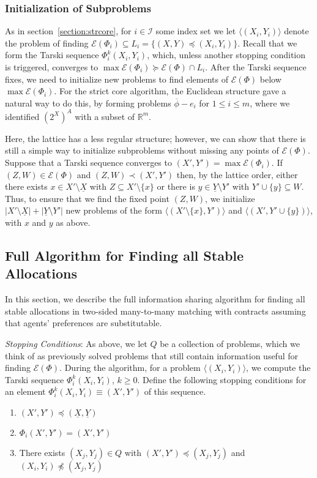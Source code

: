 \documentclass[11pt,reqno]{amsart}
\theoremstyle{definition}
\numberwithin{equation}{section}
\newcommand{\mr}{\mathbb{R}}
\newcommand{\ol}{\overline}
\newcommand{\ul}{\underline}
\newcommand{\lag}{\langle}
\newcommand{\rag}{\rangle}
\newcommand{\pre}{\phi}
\newcommand{\prealloc}{(2^X)^A}
\newcommand{\sub}{\subseteq}
\newcommand{\fix}{\mathcal{E}}
\newcommand{\suq}{\succeq}
\newcommand{\peq}{\preceq}
\newcommand{\pe}{\prec}
\newcommand{\toppre}{\ol{\pre}}
\newcommand{\act}{Q}
\newcommand{\lattice}{L}
\newcommand{\botx}{\ul{X}}
\newcommand{\boty}{\ul{Y}}
\begin{document}
\subsubsection{Initialization of Subproblems}
As in section~\ref{section:strcore}, for $i \in \mathcal{I}$ some index set we let $\lag (X_i, Y_i) \rag$ denote the problem of finding $\fix(\Phi_i) \sub \lattice_i = \{(X,Y) \peq (X_i, Y_i) \}$.
Recall that we form the Tarski sequence $\Phi_i^k(X_i,Y_i)$, which, unless another stopping condition is triggered, converges to $\max \fix(\Phi_i) \suq \fix(\Phi) \cap \lattice_i$.
After the Tarski sequence fixes, we need to initialize new problems to find elements of $\fix(\Phi)$ below $\max \fix(\Phi_i)$.
For the strict core algorithm, the Euclidean structure gave a natural way to do this, by forming problems $\toppre - e_i$ for $1 \leq i \leq m$, where we identified $\prealloc$ with a subset of $\mr^m$. 

Here, the lattice has a less regular structure; however, we can show that there is still a simple way to initialize subproblems without missing any points of $\fix(\Phi)$.
Suppose that a Tarski sequence converges to $(X',Y') = \max \fix(\Phi_i)$.
If $(Z,W) \in \fix(\Phi)$ and $(Z,W) \pe (X',Y')$ then, by the lattice order, either there exists $x \in X' \setminus \botx$ with $Z \sub X' \setminus \{x\}$ or there is $y \in \boty \setminus Y'$ with $Y' \cup \{y\} \sub W$.
Thus, to ensure that we find the fixed point $(Z,W)$, we initialize $|X' \setminus \botx| + |\boty \setminus Y'|$ new problems of the form $\lag (X' \setminus \{x\},Y') \rag$ and $\lag (X',Y' \cup \{y\}) \rag$, with $x$ and $y$ as above.

\subsection{Full Algorithm for Finding all Stable Allocations} \label{section:algostable}

In this section, we describe the full information sharing algorithm for finding all stable allocations in two-sided many-to-many matching with contracts assuming that agents' preferences are substitutable.

\emph{Stopping Conditions}:
As above, we let $\act$ be a collection of problems, which we think of as previously solved problems that still contain information useful for finding $\fix(\Phi)$. 
During the algorithm, for a problem $\lag (X_i, Y_i) \rag $, we compute the Tarski sequence $\Phi_i^k(X_i,Y_i)$, $k \geq 0$. 
Define the following stopping conditions for an element $ \Phi_i^k(X_i,Y_i) \equiv (X', Y')$ of this sequence.
\begin{enumerate}
\item $(X',Y') \peq (\botx, \boty)$ \label{cond:bottom}
\item $\Phi_i(X',Y') = (X',Y')$ \label{cond:fix}
\item There exists $(X_j,Y_j) \in \act$ with $(X',Y') \peq (X_j,Y_j)$ and $(X_i,Y_i) \not \peq (X_j,Y_j)$ \label{cond:collide}
\end{enumerate}
\end{document}

